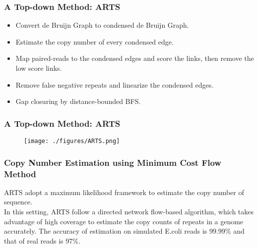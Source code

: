 \documentclass[mathserif]{beamer}
\begin{document}
	
		\begin{frame}
			\frametitle{A Top-down Method: ARTS}
			\begin{itemize}
				\item Convert de Bruijn Graph to condensed de Bruijn Graph.
				\item Estimate the copy number of every condensed edge.
				\item Map paired-reads to the condensed edges and score the links, then remove the low score links.
				\item Remove false negative repeats and linearize the condensed edges.
				\item Gap closuring by distance-bounded BFS. 
			\end{itemize}
		\end{frame}
		
		\begin{frame}
		\frametitle{A Top-down Method: ARTS}
			\begin{figure}
				\centering
				\texttt{[image: ./figures/ARTS.png]}
			\end{figure}
			
		\end{frame}				
		
		\begin{frame}
	\frametitle{Copy Number Estimation using Minimum Cost Flow Method}
	
	ARTS adopt a maximum likelihood framework to estimate the copy number of sequence.\\
	In this setting, ARTS follow a directed network flow-based algorithm, which takes advantage of high coverage to estimate the copy counts of repeats in a genome accurately.
	The accuracy of estimation on simulated E.coli reads is 99.99\% and that of real reads is 97\%.

	\end{frame}
	
\end{document}
